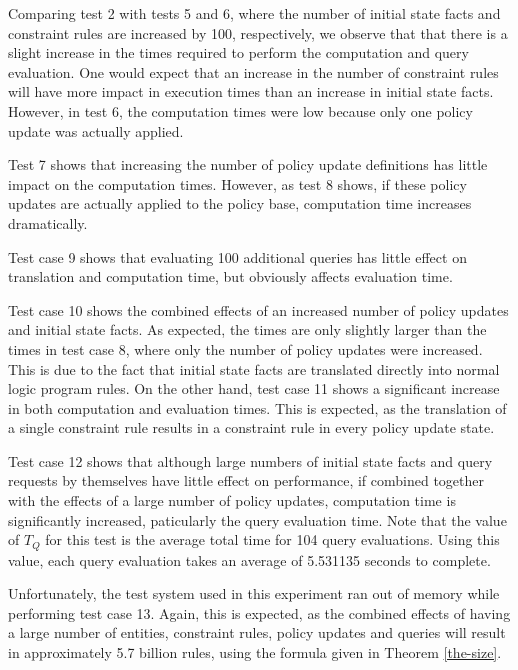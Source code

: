 \documentclass[glov2,twocolumn,final]{svjour2}
\begin{document}
      Comparing test 2 with tests 5 and 6, where the number of initial state
      facts and constraint rules are increased by 100, respectively, we observe
      that that there is a slight increase in the times required to perform the
      computation and query evaluation. One would expect that an increase in
      the number of constraint rules will have more impact in execution times
      than an increase in initial state facts. However, in test 6, the
      computation times were low because only one policy update was actually
      applied.

      Test 7 shows that increasing the number of policy update definitions
      has little impact on the computation times. However, as test 8 shows,
      if these policy updates are actually applied to the policy base,
      computation time increases dramatically.

      Test case 9 shows that evaluating 100 additional queries has little
      effect on translation and computation time, but obviously affects
      evaluation time.

      Test case 10 shows the combined effects of an increased number of policy
      updates and initial state facts. As expected, the times are only slightly
      larger than the times in test case 8, where only the number of policy
      updates were increased. This is due to the fact that initial state facts
      are translated directly into normal logic program rules. On the other
      hand, test case 11 shows a significant increase in both computation and
      evaluation times. This is expected, as the translation of a single
      constraint rule results in a constraint rule in every policy update
      state.

      Test case 12 shows that although large numbers of initial state facts and
      query requests by themselves have little effect on performance, if
      combined together with the effects of a large number of policy updates,
      computation time is significantly increased, paticularly the query
      evaluation time. Note that the value of $T_{Q}$ for this test is the
      average total time for 104 query evaluations. Using this value, each
      query evaluation takes an average of 5.531135 seconds to complete.

      Unfortunately, the test system used in this experiment ran out of memory
      while performing test case 13. Again, this is expected, as the combined
      effects of having a large number of entities, constraint rules, policy
      updates and queries will result in approximately 5.7 billion rules, using
      the formula given in Theorem \ref{the-size}.
\end{document}

